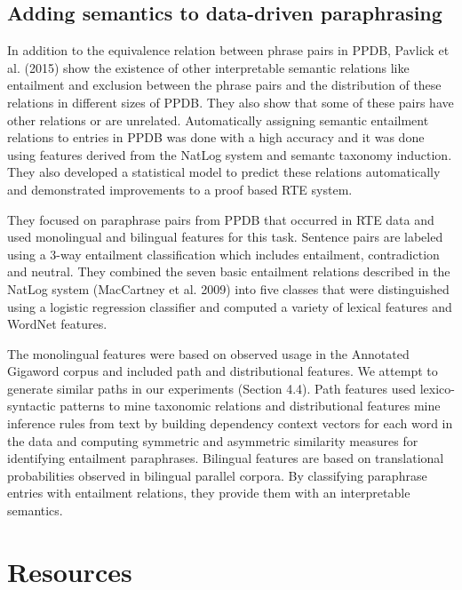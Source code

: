\documentclass[11pt]{article}
\begin{document}
\subsection{Adding semantics to data-driven paraphrasing}
 In addition to the equivalence relation between phrase pairs in PPDB, Pavlick et al. (2015) show the existence of other interpretable semantic relations like entailment and exclusion between the phrase pairs and the distribution of these relations in different sizes of PPDB. They also show that some of these pairs have other relations or are unrelated. Automatically assigning semantic entailment relations to entries in PPDB was done with a high accuracy and it was done using features derived from the NatLog system and semantc taxonomy induction. They also developed a statistical model to predict these relations automatically and demonstrated improvements to a proof based RTE system. 
 
 They focused on paraphrase pairs from PPDB that occurred in RTE data and used monolingual and bilingual features for this task. Sentence pairs are labeled using a 3-way entailment classification which includes entailment, contradiction and neutral. They combined the seven basic entailment relations described in the NatLog system (MacCartney et al. 2009) into five classes that were distinguished using a logistic regression classifier and computed a variety of lexical features and WordNet features. 
 
 The monolingual features were based on observed usage in the Annotated Gigaword corpus and included path and distributional features. We attempt to generate similar paths in our experiments (Section 4.4). Path features used lexico-syntactic patterns to mine taxonomic relations and distributional features mine inference rules from text by building dependency context vectors for each word in the data and computing symmetric and asymmetric similarity measures for identifying entailment paraphrases. Bilingual features are based on translational probabilities observed in bilingual parallel corpora. By classifying paraphrase entries with entailment relations, they provide them with an interpretable semantics.

\section {Resources}
\end{document}
